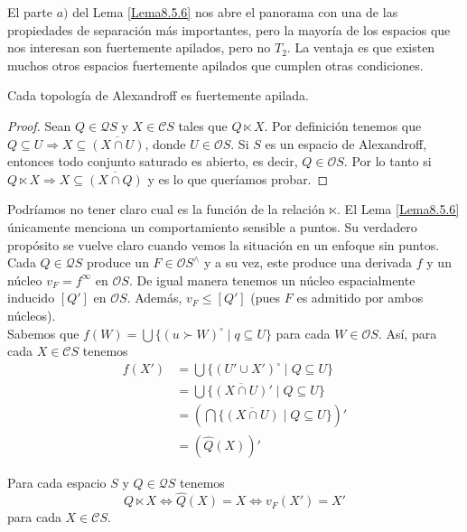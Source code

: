 El parte $a)$ del Lema \ref{Lema8.5.6} nos abre el panorama con una de las propiedades de separación más importantes, pero la mayoría de los espacios que nos interesan son fuertemente apilados, pero no $T_2$. La ventaja es que existen muchos otros espacios fuertemente apilados que cumplen otras condiciones.

\begin{lem}\label{Lema8.5.7}
    Cada topología de Alexandroff es fuertemente apilada.
\end{lem}

\begin{proof}
    Sean $Q\in \mathcal{Q}S$ y $X\in \mathcal{C}S$ tales que $Q\ltimes X$. Por definición tenemos que $Q\subseteq U\Rightarrow X\subseteq \overline{(X\cap U)}$, donde $U\in \mathcal{O}S$. Si $S$ es un espacio de Alexandroff, entonces todo conjunto saturado es abierto, es decir, $Q\in \mathcal{O}S$. Por lo tanto si $Q\ltimes X \Rightarrow X\subseteq \overline{(X\cap Q)}$ y es lo que queríamos probar.
\end{proof}

Podríamos no tener claro cual es la función de la relación $\ltimes$. El Lema \ref{Lema8.5.6} únicamente menciona un comportamiento sensible a puntos. Su verdadero propósito se vuelve claro cuando vemos la situación en un enfoque sin puntos.\\

Cada $Q\in\mathcal{Q}S$ produce un $F\in \mathcal{O}S^\wedge$ y a su vez, este produce una derivada $f$ y un núcleo $v_F=f^\infty$ en $\mathcal{O}S$. De igual manera tenemos un núcleo espacialmente inducido $[Q']$ en $\mathcal{O}S$. Además, $v_F\leq [Q']$ (pues $F$ es admitido por ambos núcleos). \\

Sabemos que $f(W)=\bigcup\{(u\succ W)^\circ\mid q\subseteq U\}$ para cada $W\in \mathcal{O}S$. Así, para cada $X\in\mathcal{C}S$ tenemos
\[
\begin{split}
f(X')&=\bigcup\{(U'\cup X')^\circ\mid Q\subseteq U\}\\
&=\bigcup\{\overline{(X\cap U)}'\mid Q\subseteq U\}\\
& =\left(\bigcap\{\overline{(X\cap U)}\mid Q\subseteq U\}\right)'\\
&=(\hat{Q}(X))'
\end{split}
\]

\begin{lem}\label{Lema8.5.8}
    Para cada espacio $S$ y $Q\in \mathcal{Q}S$ tenemos
    \[
    Q\ltimes X\Leftrightarrow \hat{Q}(X)=X\Leftrightarrow v_F(X')=X'
    \]
    para cada $X\in \mathcal{C}S$.
\end{lem}

